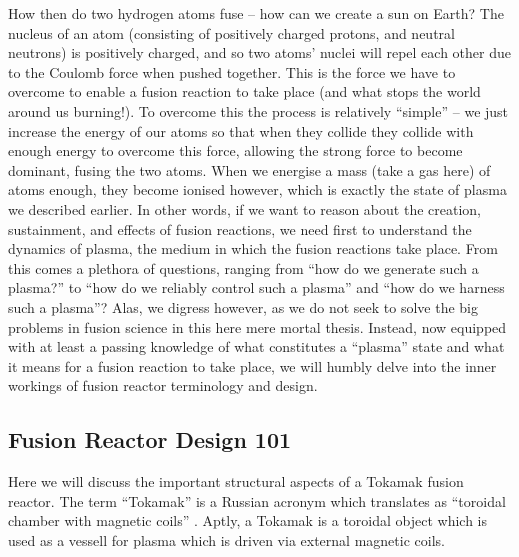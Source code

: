 How then do two hydrogen atoms fuse -- how can we create a sun on Earth? The nucleus of an atom (consisting of positively charged 
protons, and neutral neutrons) is positively charged, and so two atoms' nuclei will repel each other due to the Coulomb force when pushed together. This is the force 
we have to overcome to enable a fusion reaction to take place (and what stops the world around us burning!). To overcome this the process is relatively ``simple'' -- 
we just increase the energy of our atoms so that when they collide they collide with enough energy to overcome this force, allowing the strong force to become
dominant, fusing the two atoms. When we energise a mass (take a gas here) of atoms enough, they become ionised however, which is 
exactly the state of plasma we described earlier. In other words, if we want to reason about the creation, sustainment, and effects of 
fusion reactions, we need first to understand the dynamics of plasma, the medium in which the fusion reactions take place. From this comes a plethora of questions, ranging from 
``how do we generate such a plasma?'' to ``how do we reliably control such a plasma'' and ``how do we harness such a plasma''? Alas, we 
digress however, as we do not seek to solve the big problems in fusion science in this here mere mortal thesis. Instead, now equipped 
with at least a passing knowledge of what constitutes a ``plasma'' state and what it means for a fusion reaction to take place, 
we will humbly delve into the inner workings of fusion reactor terminology and design.


\subsection{Fusion Reactor Design 101}

Here we will discuss the important structural aspects of a Tokamak fusion reactor. The term ``Tokamak'' is a 
Russian acronym which translates as ``toroidal chamber with magnetic coils'' \cite{iter-tokamak-acronym}. Aptly, a Tokamak is a toroidal 
object which is used as a vessell for plasma which is driven via external magnetic coils. 




